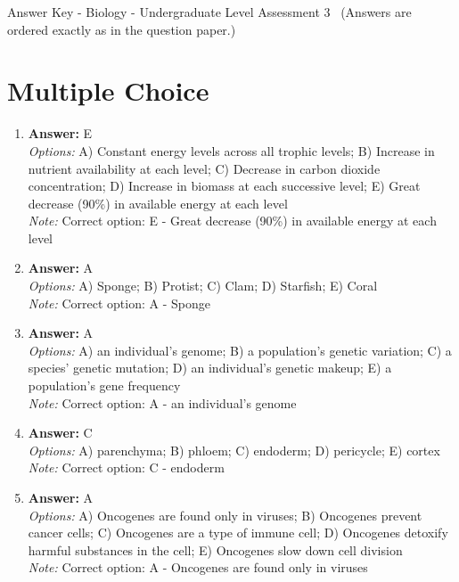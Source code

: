 \documentclass[12pt]{article}
\begin{document}
\begin{center}
Answer Key - Biology - Undergraduate Level Assessment 3 \
\small (Answers are ordered exactly as in the question paper.)
\end{center}

\section*{Multiple Choice}
\begin{enumerate}[label=\arabic*.]
\item \textbf{Answer:} E
\\ \textit{Options:} A) Constant energy levels across all trophic levels; B) Increase in nutrient availability at each level; C) Decrease in carbon dioxide concentration; D) Increase in biomass at each successive level; E) Great decrease (90\%) in available energy at each level
\\ \textit{Note:} Correct option: E - Great decrease (90\%) in available energy at each level
\item \textbf{Answer:} A
\\ \textit{Options:} A) Sponge; B) Protist; C) Clam; D) Starfish; E) Coral
\\ \textit{Note:} Correct option: A - Sponge
\item \textbf{Answer:} A
\\ \textit{Options:} A) an individual's genome; B) a population's genetic variation; C) a species' genetic mutation; D) an individual's genetic makeup; E) a population's gene frequency
\\ \textit{Note:} Correct option: A - an individual's genome
\item \textbf{Answer:} C
\\ \textit{Options:} A) parenchyma; B) phloem; C) endoderm; D) pericycle; E) cortex
\\ \textit{Note:} Correct option: C - endoderm
\item \textbf{Answer:} A
\\ \textit{Options:} A) Oncogenes are found only in viruses; B) Oncogenes prevent cancer cells; C) Oncogenes are a type of immune cell; D) Oncogenes detoxify harmful substances in the cell; E) Oncogenes slow down cell division
\\ \textit{Note:} Correct option: A - Oncogenes are found only in viruses
\end{enumerate}
\end{document}
